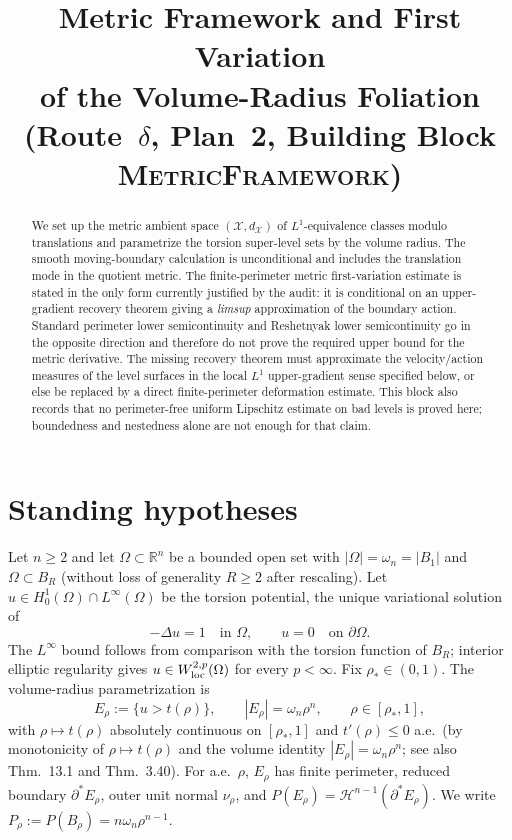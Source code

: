 \documentclass[11pt]{article}
\title{Metric Framework and First Variation\\
       of the Volume-Radius Foliation\\
       (Route~$\delta$, Plan~2, Building Block \textsc{MetricFramework})}
\author{}
\date{}
\theoremstyle{definition}
\newcommand{\R}{\mathbb{R}}
\newcommand{\Om}{\Omega}
\newcommand{\rstar}{\rho_{*}}
\newcommand{\X}{\mathcal X}
\begin{document}
\maketitle

\begin{abstract}
We set up the metric ambient space $(\X,d_\X)$ of $L^1$-equivalence classes
modulo translations and parametrize the torsion super-level sets by the
volume radius.  The smooth moving-boundary calculation is unconditional and
includes the translation mode in the quotient metric.  The finite-perimeter
metric first-variation estimate is stated in the only form currently justified
by the audit: it is conditional on an upper-gradient recovery theorem giving a
\emph{limsup} approximation of the boundary action.  Standard perimeter lower
semicontinuity and Reshetnyak lower semicontinuity go in the opposite direction
and therefore do not prove the required upper bound for the metric derivative.
The missing recovery theorem must approximate the velocity/action measures of
the level surfaces in the local $L^1$ upper-gradient sense specified below, or
else be replaced by a direct finite-perimeter deformation estimate.  This block
also records that no perimeter-free uniform Lipschitz estimate on bad levels is
proved here; boundedness and nestedness alone are not enough for that claim.
\end{abstract}

\section{Standing hypotheses}\label{sec:setup}

Let $n\ge 2$ and let $\Om\subset\R^n$ be a bounded open set with
$|\Om|=\omega_n=|B_1|$ and $\Om\subset B_R$ (without loss of generality
$R\ge 2$ after rescaling). Let
$u\in H^1_0(\Om)\cap L^\infty(\Om)$ be the torsion potential, the unique
variational solution of
\[
   -\Delta u=1\quad\text{in }\Om,\qquad u=0\quad\text{on }\partial\Om.
\]
The $L^\infty$ bound follows from comparison with the torsion function of
$B_R$; interior elliptic regularity gives $u\in W^{2,p}_{\rm loc}(\Om)$ for
every $p<\infty$. Fix $\rstar\in(0,1)$.
The volume-radius parametrization is
\begin{equation}\label{eq:rho-param}
   E_\rho:=\{u>t(\rho)\},\qquad |E_\rho|=\omega_n\rho^n,\qquad
   \rho\in[\rstar,1],
\end{equation}
with $\rho\mapsto t(\rho)$ absolutely continuous on $[\rstar,1]$ and
$t'(\rho)\le 0$ a.e.\ (by monotonicity of $\rho\mapsto t(\rho)$ and the
volume identity $|E_\rho|=\omega_n\rho^n$; see also \cite{Maggi2012}
Thm.~13.1 and \cite{AFP2000} Thm.~3.40). For a.e.\ $\rho$, $E_\rho$ has finite
perimeter, reduced boundary $\partial^*E_\rho$, outer unit normal $\nu_\rho$,
and $P(E_\rho)=\mathcal H^{n-1}(\partial^*E_\rho)$. We write
$P_\rho:=P(B_\rho)=n\omega_n\rho^{n-1}$.
\end{document}
